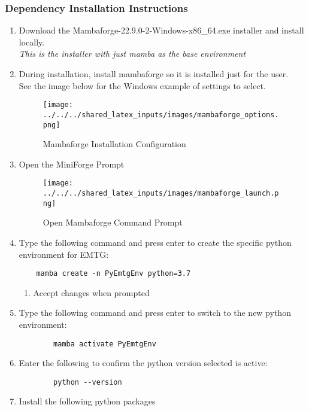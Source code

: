 \subsubsection{Dependency Installation Instructions}
\begin{enumerate}
	\item Download the Mambaforge-22.9.0-2-Windows-x86\_64.exe installer and install locally. \\ \emph{This is the installer with just mamba as the base environment}
	\item During installation, install mambaforge so it is installed just for the user. \\ See the image below for the Windows example of settings to select. 
		\begin{figure}[H]
			\centering
			\texttt{[image: ../../../shared\_latex\_inputs/images/mambaforge\_options.png]}
			\caption{Mambaforge Installation Configuration}
		\end{figure}
	\item Open the MiniForge Prompt 
		\begin{figure}[H]
			\centering
			\texttt{[image: ../../../shared\_latex\_inputs/images/mambaforge\_launch.png]}
			\caption{Open Mambaforge Command Prompt}
		\end{figure}
	\item Type the following command and press enter to create the specific python environment for EMTG: \\ 
	\begin{verbatim}
	mamba create -n PyEmtgEnv python=3.7
	\end{verbatim}
	\begin{enumerate}
		\item Accept changes when prompted
	\end{enumerate}
	\item Type the following command and press enter to switch to the new python environment: \\ 
	\begin{verbatim}
		mamba activate PyEmtgEnv
	\end{verbatim}
	\item Enter the following to confirm the python version selected is active: \\
	\begin{verbatim}
		python --version
	\end{verbatim}	
	\item Install the following python packages

\end{enumerate}
